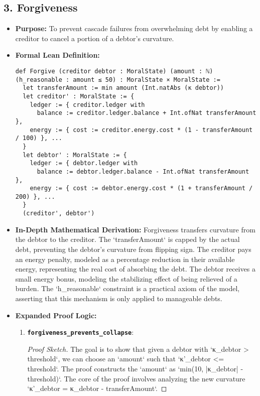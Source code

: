 \documentclass[11pt,a4paper]{article}
\begin{document}
\subsection{3. Forgiveness}
\begin{itemize}
    \item \textbf{Purpose:} To prevent cascade failures from overwhelming debt by enabling a creditor to cancel a portion of a debtor's curvature.
    \item \textbf{Formal Lean Definition:}
\begin{lstlisting}
def Forgive (creditor debtor : MoralState) (amount : ℕ) (h_reasonable : amount ≤ 50) : MoralState × MoralState :=
  let transferAmount := min amount (Int.natAbs (κ debtor))
  let creditor' : MoralState := {
    ledger := { creditor.ledger with
      balance := creditor.ledger.balance + Int.ofNat transferAmount },
    energy := { cost := creditor.energy.cost * (1 - transferAmount / 100) }, ...
  }
  let debtor' : MoralState := {
    ledger := { debtor.ledger with
      balance := debtor.ledger.balance - Int.ofNat transferAmount },
    energy := { cost := debtor.energy.cost * (1 + transferAmount / 200) }, ...
  }
  (creditor', debtor')
\end{lstlisting}
    \item \textbf{In-Depth Mathematical Derivation:}
        Forgiveness transfers curvature from the debtor to the creditor. The `transferAmount` is capped by the actual debt, preventing the debtor's curvature from flipping sign. The creditor pays an energy penalty, modeled as a percentage reduction in their available energy, representing the real cost of absorbing the debt. The debtor receives a small energy bonus, modeling the stabilizing effect of being relieved of a burden. The `h_reasonable` constraint is a practical axiom of the model, asserting that this mechanism is only applied to manageable debts.
    \item \textbf{Expanded Proof Logic:}
        \begin{enumerate}
            \item \textbf{\texttt{forgiveness\_prevents\_collapse}}:
                \begin{proof}[Proof Sketch]
                    The goal is to show that given a debtor with `κ_debtor > threshold`, we can choose an `amount` such that `κ'_debtor <= threshold`. The proof constructs the `amount` as `min(10, |κ_debtor| - threshold)`.
                    The core of the proof involves analyzing the new curvature `κ'_debtor = κ_debtor - transferAmount`.

\end{proof}
\end{enumerate}
\end{itemize}
\end{document}
